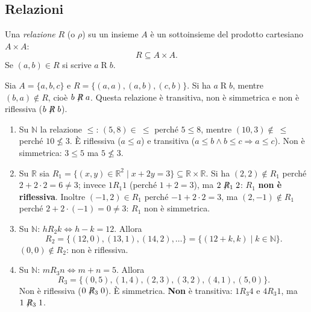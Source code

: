 \documentclass[11pt,a4paper]{article}
\begin{document}
\subsection{Relazioni}

\begin{definizione}
Una \emph{relazione} $R$ (o $\rho$) su un insieme $A$ è un sottoinsieme del
prodotto cartesiano $A \times A$:
\[
R \subseteq A \times A.
\]
Se $(a, b) \in R$ si scrive $a \mathrel{R} b$.
\end{definizione}

\begin{esempio}
Sia $A = \{a, b, c\}$ e $R = \{(a,a), (a,b), (c,b)\}$. Si ha
$a \mathrel{R} b$, mentre $(b, a) \notin R$, cioè $b \not\mathrel{R} a$.
Questa relazione è transitiva, non è simmetrica e non è riflessiva
($b \not\mathrel{R} b$).
\end{esempio}

\begin{esempio}
\leavevmode
\begin{enumerate}
    \item Su $\mathbb{N}$ la relazione $\leq$: $(5, 8) \in\ \leq$ perché
          $5 \leq 8$, mentre $(10, 3) \notin\ \leq$ perché $10 \nleq 3$.
          È riflessiva ($a \leq a$) e transitiva
          ($a \leq b \land b \leq c \Rightarrow a \leq c$). Non è
          simmetrica: $3 \leq 5$ ma $5 \nleq 3$.

    \item Su $\mathbb{R}$ sia
          $R_1 = \{(x, y) \in \mathbb{R}^2 \mid x + 2y = 3\}
          \subseteq \mathbb{R} \times \mathbb{R}$.
          Si ha $(2, 2) \notin R_1$ perché $2 + 2 \cdot 2 = 6 \neq 3$;
          invece $1 \mathrel{R_1} 1$ (perché $1 + 2 = 3$), ma
          $2 \not\mathrel{R_1} 2$: $R_1$ \textbf{non è riflessiva}.
          Inoltre $(-1, 2) \in R_1$ perché $-1 + 2 \cdot 2 = 3$, ma
          $(2, -1) \notin R_1$ perché $2 + 2 \cdot (-1) = 0 \neq 3$:
          $R_1$ non è simmetrica.

    \item Su $\mathbb{N}$: $h \mathrel{R_2} k \iff h - k = 12$. Allora
          \[
          R_2 = \{(12, 0), (13, 1), (14, 2), \dots\}
              = \{(12 + k, k) \mid k \in \mathbb{N}\}.
          \]
          $(0, 0) \notin R_2$: non è riflessiva.

    \item Su $\mathbb{N}$: $m \mathrel{R_3} n \iff m + n = 5$. Allora
          \[
          R_3 = \{(0,5), (1,4), (2,3), (3,2), (4,1), (5,0)\}.
          \]
          Non è riflessiva ($0 \not\mathrel{R_3} 0$). È simmetrica.
          \textbf{Non} è transitiva: $1 \mathrel{R_3} 4$ e
          $4 \mathrel{R_3} 1$, ma $1 \not\mathrel{R_3} 1$.
\end{enumerate}
\end{esempio}
\end{document}
